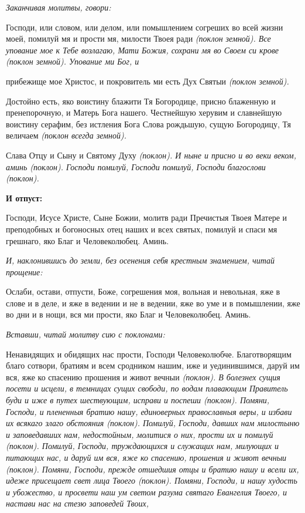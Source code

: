  \itshape Заканчивая молитвы, говори:\normalfont{}


   Господи, или словом, или делом, или помышлением согреших
во всей жизни моей, помилуй мя и прости мя, милости Твоея ради
\itshape (поклон земной)\normalfont{}. Все упование мое к Тебе возлагаю, Мати Божия,
сохрани мя во Своем си крове \itshape (поклон земной)\normalfont{}. Упование ми Бог, и

прибежище мое Христос, и покровитель ми есть Дух Святыи \itshape (поклон
земной)\normalfont{}.


   Достойно есть, яко воистину блажити Тя Богородице, присно блаженную
и пренепорочную, и Матерь Бога нашего. Честнейшую херувим и
славнейшую воистину серафим, без истления Бога Слова рождьшую, сущую
Богородицу, Тя величаем \itshape (поклон всегда земной)\normalfont{}.


   Слава Отцу и Сыну и Святому Духу \itshape (поклон)\normalfont{}. И ныне и присно и во веки
веком, аминь \itshape (поклон)\normalfont{}. Господи помилуй, Господи помилуй, Господи
благослови \itshape (поклон)\normalfont{}.



 

\bfseries И отпуст:\normalfont{}


   Господи, Исусе Христе, Сыне Божии, молитв ради Пречистыя Твоея
Матере и преподобных и богоносных отец наших и всех святых, помилуй и
спаси мя грешнаго, яко Благ и Человеколюбец. Аминь.


 \itshape И, наклонившись до земли, без осенения себя крестным знамением, читай
прощение:\normalfont{}


   Ослаби, остави, отпусти, Боже, согрешения моя, вольная и невольная,
яже в слове и в деле, и яже в ведении и не в ведении, яже во уме
и в помышлении, яже во дни и в нощи, вся ми прости, яко Благ и
Человеколюбец. Аминь.


 \itshape Вставши, читай молитву сию с поклонами:\normalfont{}


   Ненавидящих и обидящих нас прости, Господи Человеколюбче.
Благотворящим благо сотвори, братиям и всем сродником нашим, иже и
уединившимся, даруй им вся, яже ко спасению прошения и живот вечныи
\itshape (поклон)\normalfont{}. В болезнех сущия посети и исцели, в темницах сущих свободи, по
водам плавающим Правитель буди и иже в путех шествующим, исправи и
поспеши \itshape (поклон)\normalfont{}. Помяни, Господи, и плененныя братию нашу, единоверных
православныя веры, и избави их всякаго злаго обстояния \itshape (поклон)\normalfont{}.
Помилуй, Господи, давших нам милостыню и заповедавших нам,
недостойным, молитися о них, прости их и помилуй \itshape (поклон)\normalfont{}. Помилуй,
Господи, труждающихся и служащих нам, милующих и питающих
нас, и даруй им вся, яже ко спасению, прошения и живот вечныи
\itshape (поклон)\normalfont{}. Помяни, Господи, прежде отшедшия отцы и братию нашу
и всели их, идеже присещает свет лица Твоего \itshape (поклон)\normalfont{}. Помяни,
Господи, и нашу худость и убожество, и просвети наш ум светом разума
святаго Евангелия Твоего, и настави нас на стезю заповедей Твоих,

